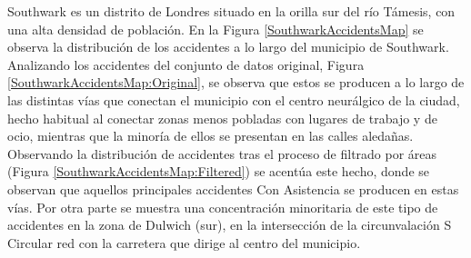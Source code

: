 \documentclass{uathesis-es}
\begin{document}
{		Southwark es un distrito de Londres situado en la orilla sur del río Támesis, con una alta densidad de población. En la Figura \ref{SouthwarkAccidentsMap} se observa la distribución de los accidentes a lo largo del municipio de Southwark. Analizando los accidentes del conjunto de datos original, Figura \ref{SouthwarkAccidentsMap:Original}, se observa que estos se producen a lo largo de las distintas vías que conectan el municipio con el centro neurálgico de la ciudad, hecho habitual al conectar zonas menos pobladas con lugares de trabajo y de ocio, mientras que la minoría de ellos se presentan en las calles aledañas. Observando la distribución de accidentes tras el proceso de filtrado por áreas (Figura \ref{SouthwarkAccidentsMap:Filtered}) se acentúa este hecho, donde se observan que aquellos principales accidentes Con Asistencia se producen en estas vías. Por otra parte se muestra una concentración minoritaria de este tipo de accidentes en la zona de Dulwich (sur), en la intersección de la circunvalación S Circular red con la carretera que dirige al centro del municipio.
		
		
}
\end{document}
